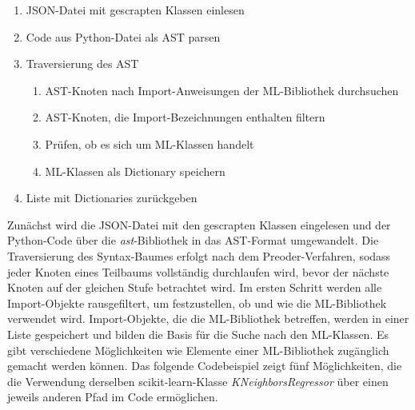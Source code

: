 \documentclass[german,bachelor]{swsLeipzig}
\begin{document}
\begin{enumerate}
 \item JSON-Datei mit gescrapten Klassen einlesen
 \item Code aus Python-Datei als AST parsen
 \item Traversierung des AST
\begin{enumerate}
    \item AST-Knoten nach Import-Anweisungen der ML-Bibliothek durchsuchen
    \item AST-Knoten, die Import-Bezeichnungen enthalten filtern
    \item Prüfen, ob es sich um ML-Klassen handelt
    \item ML-Klassen als Dictionary speichern
    \end{enumerate}
 \item Liste mit Dictionaries zurückgeben
\end{enumerate}

Zunächst wird die JSON-Datei mit den gescrapten Klassen eingelesen und der Python-Code über die \textit{ast}-Bibliothek in das AST-Format umgewandelt.
Die Traversierung des Syntax-Baumes erfolgt nach dem Preoder-Verfahren, sodass jeder Knoten eines Teilbaums vollständig
durchlaufen wird, bevor der nächste Knoten auf der gleichen Stufe betrachtet wird.
Im ersten Schritt werden alle Import-Objekte rausgefiltert, um festzustellen, ob und wie die ML-Bibliothek verwendet wird.
Import-Objekte, die die ML-Bibliothek betreffen, werden in einer Liste gespeichert und bilden die Basis für die Suche nach
den ML-Klassen.
Es gibt verschiedene Möglichkeiten wie Elemente einer ML-Bibliothek zugänglich gemacht werden können.
Das folgende Codebeispiel zeigt fünf Möglichkeiten, die die Verwendung derselben scikit-learn-Klasse \textit{KNeighborsRegressor}
über einen jeweils anderen Pfad im Code ermöglichen. \\
\end{document}
